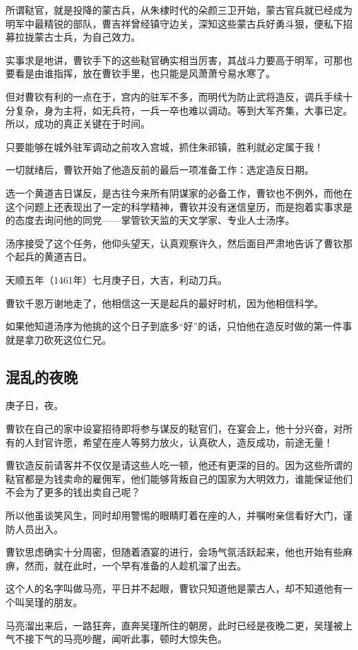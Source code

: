 \begin{multicols}{\theparacolNo}
所谓鞑官，就是投降的蒙古兵，从朱棣时代的朵颜三卫开始，蒙古官兵就已经成为明军中最精锐的部队，曹吉祥曾经镇守边关，深知这些蒙古兵好勇斗狠，便私下招募拉拢蒙古士兵，为自己效力。

实事求是地讲，曹钦手下的这些鞑官确实相当厉害，其战斗力要高于明军，可那也要看是由谁指挥，放在曹钦手里，也只能是风萧萧兮易水寒了。

但对曹钦有利的一点在于，宫内的驻军不多，而明代为防止武将造反，调兵手续十分复杂，身为主将，如无兵符，一兵一卒也难以调动。等到大军齐集，大事已定。所以，成功的真正关键在于时间。

只要能够在城外驻军调动之前攻入宫城，抓住朱祁镇，胜利就必定属于我！

一切就绪后，曹钦开始了他造反前的最后一项准备工作：选定造反日期。

选一个黄道吉日谋反，是古往今来所有阴谋家的必备工作，曹钦也不例外，而他在这个问题上还表现出了一定的科学精神，曹钦并没有迷信皇历，而是抱着实事求是的态度去询问他的同党——掌管钦天监的天文学家、专业人士汤序。

汤序接受了这个任务，他仰头望天，认真观察许久，然后面目严肃地告诉了曹钦那个起兵的黄道吉日。

天顺五年（1461年）七月庚子日，大吉，利动刀兵。

曹钦千恩万谢地走了，他相信这一天是起兵的最好时机，因为他相信科学。

如果他知道汤序为他挑的这个日子到底多“好”的话，只怕他在造反时做的第一件事就是拿刀砍死这位仁兄。

\subsection{混乱的夜晚}
庚子日，夜。

曹钦在自己的家中设宴招待即将参与谋反的鞑官们，在宴会上，他十分兴奋，对所有的人封官许愿，希望在座人等努力放火，认真砍人，造反成功，前途无量！

曹钦造反前请客并不仅仅是请这些人吃一顿，他还有更深的目的。因为这些所谓的鞑官都是为钱卖命的雇佣军，他们能够背叛自己的国家为大明效力，谁能保证他们不会为了更多的钱出卖自己呢？

所以他虽谈笑风生，同时却用警惕的眼睛盯着在座的人，并嘱咐亲信看好大门，谨防人员出入。

曹钦思虑确实十分周密，但随着酒宴的进行，会场气氛活跃起来，他也开始有些麻痹，然而，就在此时，一个早有准备的人趁机溜了出去。

这个人的名字叫做马亮，平日并不起眼，曹钦只知道他是蒙古人，却不知道他有一个叫吴瑾的朋友。

马亮溜出来后，一路狂奔，直奔吴瑾所住的朝房，此时已经是夜晚二更，吴瑾被上气不接下气的马亮吵醒，闻听此事，顿时大惊失色。


\end{multicols}
